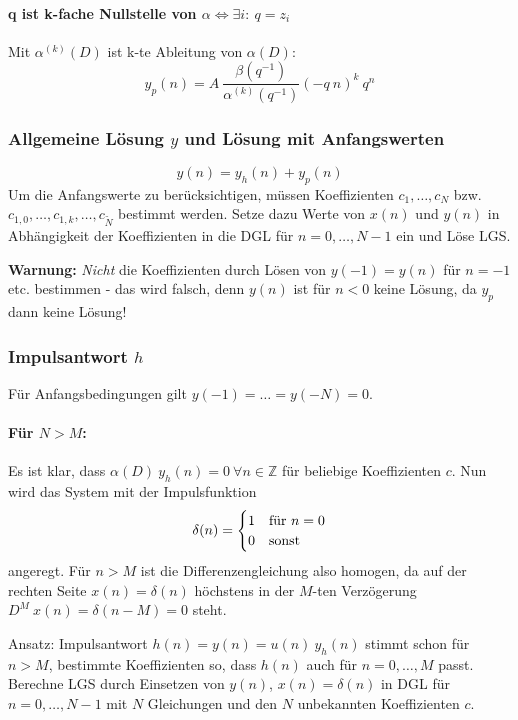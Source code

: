 \documentclass[10pt,a4paper]{article}
\begin{document}
\paragraph{q ist k-fache Nullstelle von $\alpha \Leftrightarrow \exists i: ~ q = z_i$} Mit $\alpha^{(k)}(D)$ ist k-te Ableitung von $\alpha(D)$:
\[
	y_p(n) = A ~ \frac{\beta(q^{-1})}{\alpha^{(k)}(q^{-1})} (-q ~ n)^k ~ q^n
\]

\subsubsection*{Allgemeine Lösung $y$ und Lösung mit Anfangswerten}
\[
	y(n) = y_h(n) + y_p(n)
\]
Um die Anfangswerte zu berücksichtigen, müssen Koeffizienten $c_1, …, c_N$ bzw. $c_{1,0}, …, c_{1,k}, …, c_{\tilde N}$ bestimmt werden. Setze dazu Werte von $x(n)$ und $y(n)$ in Abhängigkeit der Koeffizienten in die DGL für $n = 0, …, N - 1$ ein und Löse LGS.

\vspace{.5em}
\raggedright
\textbf{Warnung:} \textit{Nicht} die Koeffizienten durch Lösen von $y(-1) = y(n)$ für $n = -1$ etc. bestimmen - das wird falsch, denn $y(n)$ ist für $n < 0$ keine Lösung, da $y_p$ dann keine Lösung!

\subsubsection*{Impulsantwort $h$}
Für Anfangsbedingungen gilt $y(-1) = … = y(-N) = 0$.
\paragraph{Für $N > M$:} Es ist klar, dass $\alpha(D) ~ y_h(n) = 0 ~ \forall n \in \mathbb Z$ für beliebige Koeffizienten $c$. Nun wird das System mit der Impulsfunktion 
\[
	\delta(n) =
	\begin{cases}
		1 & \textnormal{für } n = 0 \\
		0 & \textnormal{sonst}
	\end{cases}
\]
angeregt. Für $n > M$ ist die Differenzengleichung also homogen, da auf der rechten Seite $x(n) = \delta(n)$ höchstens in der $M$-ten Verzögerung $D^M ~ x(n) = \delta(n - M) = 0$ steht.

\vspace{.5em}
Ansatz: Impulsantwort $h(n) = y(n) = u(n) ~ y_h(n)$ stimmt schon für $n > M$, bestimmte Koeffizienten so, dass $h(n)$ auch für $n = 0, …, M$ passt. Berechne LGS durch Einsetzen von $y(n)$, $x(n) = \delta(n)$ in DGL für $n = 0, …, N - 1$ mit $N$ Gleichungen und den $N$ unbekannten Koeffizienten $c$.
\end{document}
